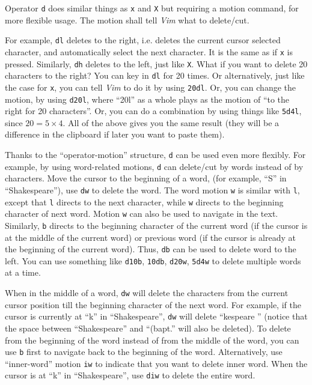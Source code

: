 Operator \verb|d| does similar things as \verb|x| and \verb|X| but requiring a motion command, for more flexible usage. The motion shall tell \textit{Vim} what to delete/cut.

For example, \verb|dl| deletes to the right, i.e. deletes the current cursor selected character, and automatically select the next character. It is the same as if \verb|x| is pressed. Similarly, \verb|dh| deletes  to the left, just like \verb|X|. What if you want to delete 20 characters to the right? You can key in \verb|dl| for 20 times. Or alternatively, just like the case for \verb|x|, you can tell \textit{Vim} to do it by using \verb|20dl|. Or, you can change the motion, by using \verb|d20l|, where ``20l'' as a whole plays as the motion of ``to the right for 20 characters''. Or, you can do a combination by using things like \verb|5d4l|, since $20=5\times 4$. All of the above gives you the same result (they will be a difference in the clipboard if later you want to paste them).

Thanks to the ``operator-motion'' structure, \verb|d| can be used even more flexibly. For example, by using word-related motions, \verb|d| can delete/cut by words instead of by characters. Move the cursor to the beginning of a word, (for example, ``S'' in ``Shakespeare''), use \verb|dw| to delete the word. The word motion \verb|w| is similar with \verb|l|, except that \verb|l| directs to the next character, while \verb|w| directs to the beginning character of next word. Motion \verb|w| can also be used to navigate in the text. Similarly, \verb|b| directs to the beginning character of the current word (if the cursor is at the middle of the current word) or previous word (if the cursor is already at the beginning of the current word). Thus, \verb|db| can be used to delete word to the left. You can use something like \verb|d10b|, \verb|10db|, \verb|d20w|, \verb|5d4w| to delete multiple words at a time.

When in the middle of a word, \verb|dw| will delete the characters from the current cursor position till the beginning character of the next word. For example, if the cursor is currently at ``k'' in ``Shakespeare'', \verb|dw| will delete ``kespeare '' (notice that the space between ``Shakespeare'' and ``(bapt.'' will also be deleted). To delete from the beginning of the word instead of from the middle of the word, you can use \verb|b| first to navigate back to the beginning of the word. Alternatively, use ``inner-word'' motion \verb|iw| to indicate that you want to delete inner word. When the cursor is at ``k'' in ``Shakespeare'', use \verb|diw| to delete the entire word.

